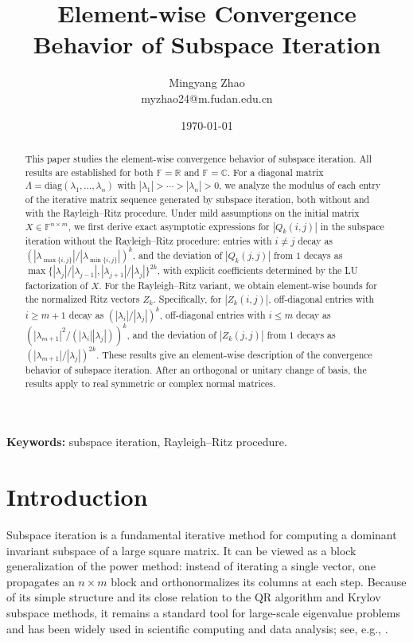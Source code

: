 \documentclass[11pt,a4paper]{article}
\title{\textbf{Element-wise Convergence Behavior of Subspace Iteration}}
\author{Mingyang Zhao\\
myzhao24@m.fudan.edu.cn
}
\date{\today}
\theoremstyle{plain}              %
\theoremstyle{definition}         %
\begin{document}
\maketitle


\begin{abstract}
This paper studies the element-wise convergence behavior of subspace iteration. All results are established for both \(\mathbb{F}=\mathbb{R}\) and \(\mathbb{F}=\mathbb{C}\). For a diagonal matrix \(\Lambda=\mathrm{diag}(\lambda_1,\ldots,\lambda_n)\) with \(|\lambda_1|>\cdots>|\lambda_n|>0\), we analyze the modulus of each entry of the iterative matrix sequence generated by subspace iteration, both without and with the Rayleigh--Ritz procedure. Under mild assumptions on the initial matrix \(X\in\mathbb{F}^{n\times m}\), we first derive exact asymptotic expressions for \(|Q_k(i,j)|\) in the subspace iteration without the Rayleigh--Ritz procedure: entries with \(i\neq j\) decay as \((|\lambda_{\max\{i,j\}}|/|\lambda_{\min\{i,j\}}|)^k\), and the deviation of \(|Q_k(j,j)|\) from \(1\) decays as \(\max\{|\lambda_j|/|\lambda_{j-1}|,|\lambda_{j+1}|/|\lambda_j|\}^{2k}\), with explicit coefficients determined by the LU factorization of \(X\). For the Rayleigh--Ritz variant, we obtain element-wise bounds for the normalized Ritz vectors \(Z_k\). Specifically, for \(|Z_k(i,j)|\), off-diagonal entries with \(i\geq m+1\) decay as \((|\lambda_i|/|\lambda_j|)^k\), off-diagonal entries with \(i\leq m\) decay as \((|\lambda_{m+1}|^2/(|\lambda_i||\lambda_j|))^k\), and the deviation of \(|Z_k(j,j)|\) from \(1\) decays as \((|\lambda_{m+1}|/|\lambda_j|)^{2k}\). These results give an element-wise description of the convergence behavior of subspace iteration. After an orthogonal or unitary change of basis, the results apply to real symmetric or complex normal matrices.
\end{abstract}

\textbf{Keywords:} subspace iteration, Rayleigh--Ritz procedure.

\section{Introduction}

Subspace iteration is a fundamental iterative method for computing a dominant invariant subspace of a large square matrix. It can be viewed as a block generalization of the power method: instead of iterating a single vector, one propagates an \(n\times m\) block and orthonormalizes its columns at each step. Because of its simple structure and its close relation to the QR algorithm and Krylov subspace methods, it remains a standard tool for large-scale eigenvalue problems and has been widely used in scientific computing and data analysis; see, e.g., \cite{golub_book,parlett_book,saad_book}.
\end{document}
